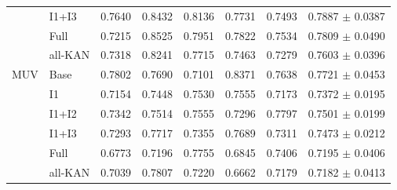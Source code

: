 \begin{landscape}
\begin{longtable}{llrrrrrr}
 & I1+I3 & 0.7640 & 0.8432 & 0.8136 & 0.7731 & 0.7493 & 0.7887 $\pm$ 0.0387 \\
 & Full & 0.7215 & 0.8525 & 0.7951 & 0.7822 & 0.7534 & 0.7809 $\pm$ 0.0490 \\
 & all-KAN & 0.7318 & 0.8241 & 0.7715 & 0.7463 & 0.7279 & 0.7603 $\pm$ 0.0396 \\
\midrule
MUV & Base & 0.7802 & 0.7690 & 0.7101 & 0.8371 & 0.7638 & 0.7721 $\pm$ 0.0453 \\
 & I1 & 0.7154 & 0.7448 & 0.7530 & 0.7555 & 0.7173 & 0.7372 $\pm$ 0.0195 \\
 & I1+I2 & 0.7342 & 0.7514 & 0.7555 & 0.7296 & 0.7797 & 0.7501 $\pm$ 0.0199 \\
 & I1+I3 & 0.7293 & 0.7717 & 0.7355 & 0.7689 & 0.7311 & 0.7473 $\pm$ 0.0212 \\
 & Full & 0.6773 & 0.7196 & 0.7755 & 0.6845 & 0.7406 & 0.7195 $\pm$ 0.0406 \\
 & all-KAN & 0.7039 & 0.7807 & 0.7220 & 0.6662 & 0.7179 & 0.7182 $\pm$ 0.0413 \\
\bottomrule
\end{longtable}
\end{landscape}
